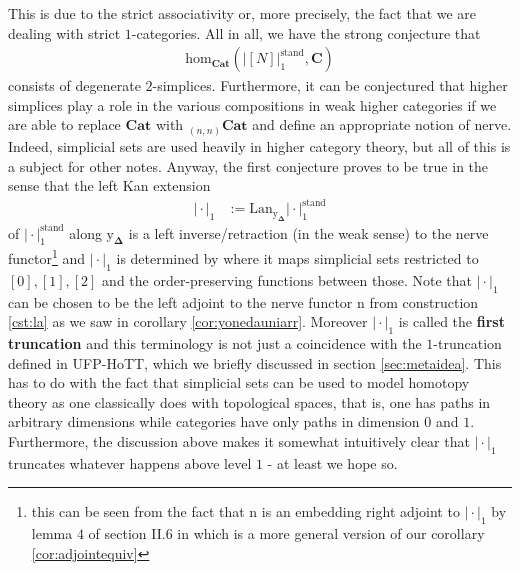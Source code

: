 \begin{cst}[Nerve]
This is due to the strict associativity or, more precisely, the fact that we are dealing with strict $1$-categories.
All in all, we have the strong conjecture that
\begin{align*}
  \mathrm{hom}_{\mathbf{Cat}}
  \left(
    \left\vert
      [N]
    \right\vert_{1}^{\textrm{stand}},
    \mathbf{C}
  \right)
\end{align*}
consists of degenerate $2$-simplices.
Furthermore, it can be conjectured that higher simplices play a role in the various compositions in weak higher categories if we are able to replace $\mathbf{Cat}$ with ${}_{(n,n)}\mathbf{Cat}$ and define an appropriate notion of nerve.
Indeed, simplicial sets are used heavily in higher category theory, but all of this is a subject for other notes.
Anyway, the first conjecture proves to be true in the sense that the left Kan extension
\begin{align*}
  \vert
    \cdot
  \vert_{1}
  &:=
  \mathrm{Lan}_{\mathrm{y}_{\mathbf{\Delta}}}
  \vert
    \cdot
  \vert_{1}^{\textrm{stand}}
\end{align*}
of $\vert \cdot \vert_{1}^{\textrm{stand}}$ along $\mathrm{y}_{\mathbf{\Delta}}$ is a left inverse/retraction (in the weak sense) to the nerve functor\footnote{this can be seen from the fact that $\mathrm{n}$ is an embedding right adjoint to $\vert \cdot \vert_{1}$ by lemma $4$ of section II.6 in \cite{c55c71e8} which is a more general version of our corollary \ref{cor:adjointequiv}} and $\vert \cdot \vert_{1}$ is determined by where it maps simplicial sets restricted to $[0],[1],[2]$ and the order-preserving functions between those.
Note that $\vert \cdot \vert_{1}$ can be chosen to be the left adjoint to the nerve functor $\mathrm{n}$ from construction \ref{cst:la} as we saw in corollary \ref{cor:yonedauniarr}.
Moreover $\vert \cdot \vert_{1}$ is called the \textbf{first truncation} and this terminology is not just a coincidence with the $1$-truncation defined in UFP-HoTT, which we briefly discussed in section \ref{sec:metaidea}.
This has to do with the fact that simplicial sets can be used to model homotopy theory as one classically does with topological spaces, that is, one has paths in arbitrary dimensions while categories have only paths in dimension $0$ and $1$.
Furthermore, the discussion above makes it somewhat intuitively clear that $\vert \cdot \vert_{1}$ truncates whatever happens above level $1$ - at least we hope so.
\end{cst}
